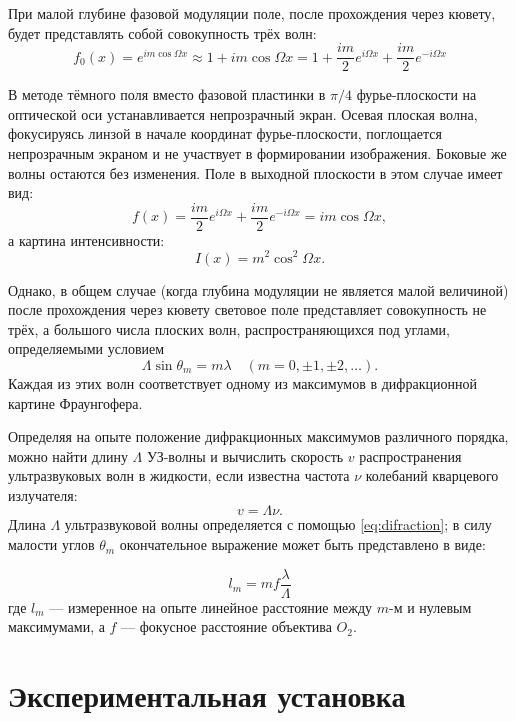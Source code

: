 \indent
При малой глубине фазовой модуляции поле, после прохождения через кювету, будет представлять собой совокупность трёх волн:
\begin{equation}
f_0(x) = e^{im\cos \Omega x} \approx 1 + im\cos \Omega x = 1 + \frac{im}{2}e^{i\Omega x} + \frac{im}{2}e^{-i\Omega x}
\end{equation}


\indent
В методе тёмного поля вместо фазовой пластинки в $\pi/4$ фурье-плоскости на оптической оси устанавливается непрозрачный экран. Осевая плоская волна, фокусируясь линзой в начале координат фурье-плоскости, поглощается непрозрачным экраном и не участвует в формировании изображения. Боковые же волны остаются без изменения. Поле в выходной плоскости в этом случае имеет вид:
$$
f(x) = \frac{im}{2} e^{i\Omega x} + \frac{im}{2} e^{-i\Omega x} = im \cos \Omega x,
$$
а картина интенсивности:
$$
I(x) = m^2 \cos^2 \Omega x.
$$

\indent
Однако, в общем случае (когда глубина модуляции не является малой величиной) после прохождения через кювету световое поле представляет совокупность не трёх, а большого числа плоских волн, распространяющихся под углами, определяемыми условием
\begin{equation}
\Lambda \sin\theta_m = m\lambda \quad (m = 0, \pm 1, \pm 2, \ldots). \label{eq:difraction}
\end{equation}
Каждая из этих волн соответствует одному из максимумов в дифракционной картине Фраунгофера.

Определяя на опыте положение дифракционных максимумов различного порядка, можно найти длину $\Lambda$ УЗ-волны и вычислить скорость $v$ распространения ультразвуковых волн в жидкости, если известна частота $\nu$ колебаний кварцевого излучателя:
$$
v = \Lambda \nu.
$$
Длина $\Lambda$ ультразвуковой волны определяется с помощью \ref{eq:difraction}; в силу малости углов $\theta_m$ окончательное выражение может быть представлено в виде:

\begin{equation}
    l_m = mf \frac{\lambda}{\Lambda}\label{eq:l_m}
\end{equation}
\noindent
где $l_m$ — измеренное на опыте линейное расстояние между $m$-м и нулевым максимумами, а $f$ — фокусное расстояние объектива $O_2$.

\section*{Экспериментальная установка}

